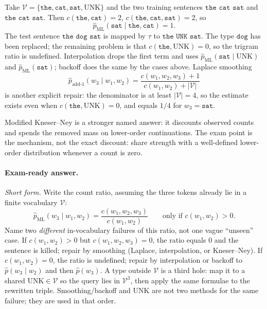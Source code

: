 \documentclass[11pt,a4paper]{article}
\theoremstyle{definition}
\begin{document}
\begin{example}
Take \(\mathcal{V}=\{\texttt{the},\texttt{cat},\texttt{sat},\mathrm{UNK}\}\) and the two training sentences \(\texttt{the cat sat}\) and \(\texttt{the cat sat}\). Then \(c(\texttt{the},\texttt{cat})=2\), \(c(\texttt{the},\texttt{cat},\texttt{sat})=2\), so
\[
\widehat p_{\mathrm{ML}}(\texttt{sat}\mid\texttt{the},\texttt{cat})=1.
\]
The test sentence \(\texttt{the dog sat}\) is mapped by \(\tau\) to \(\texttt{the UNK sat}\). The type \(\texttt{dog}\) has been replaced; the remaining problem is that \(c(\texttt{the},\mathrm{UNK})=0\), so the trigram ratio is undefined. Interpolation drops the first term and uses \(\widehat p_{\mathrm{ML}}(\texttt{sat}\mid\mathrm{UNK})\) and \(\widehat p_{\mathrm{ML}}(\texttt{sat})\); backoff does the same by the cases above. Laplace smoothing
\[
\widehat p_{\mathrm{add\text{-}1}}(w_3\mid w_1,w_2)
=\frac{c(w_1,w_2,w_3)+1}{c(w_1,w_2)+|\mathcal{V}|}
\]
is another explicit repair: the denominator is at least \(|\mathcal{V}|=4\), so the estimate exists even when \(c(\texttt{the},\mathrm{UNK})=0\), and equals \(1/4\) for \(w_3=\texttt{sat}\).
\end{example}

Modified Kneser--Ney is a stronger named answer: it discounts observed counts and spends the removed mass on lower-order continuations. The exam point is the mechanism, not the exact discount: share strength with a well-defined lower-order distribution whenever a count is zero.

\paragraph{Exam-ready answer.}
\textit{Short form.}
Write the count ratio, assuming the three tokens already lie in a finite vocabulary \(\mathcal{V}\):
\[
\widehat p_{\mathrm{ML}}(w_3\mid w_1,w_2)
=\frac{c(w_1,w_2,w_3)}{c(w_1,w_2)}
\qquad\text{only if }c(w_1,w_2)>0.
\]
Name two \emph{different} in-vocabulary failures of this ratio, not one vague ``unseen'' case. If \(c(w_1,w_2)>0\) but \(c(w_1,w_2,w_3)=0\), the ratio equals \(0\) and the sentence is killed; repair by smoothing (Laplace, interpolation, or Kneser--Ney). If \(c(w_1,w_2)=0\), the ratio is undefined; repair by interpolation or backoff to \(\widehat p(w_3\mid w_2)\) and then \(\widehat p(w_3)\). A type outside \(\mathcal{V}\) is a third hole: map it to a shared \(\mathrm{UNK}\in\mathcal{V}\) so the query lies in \(\mathcal{V}^3\), then apply the same formulae to the rewritten triple. Smoothing/backoff and \(\mathrm{UNK}\) are not two methods for the same failure; they are used in that order.
\end{document}
